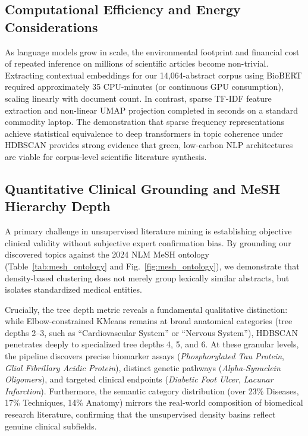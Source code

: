 \documentclass[a4paper,fleqn]{cas-dc}
\begin{document}
\subsection{Computational Efficiency and Energy Considerations}

As language models grow in scale, the environmental footprint and financial cost of repeated inference on millions of scientific articles become non-trivial. Extracting contextual embeddings for our 14,064-abstract corpus using BioBERT required approximately 35 CPU-minutes (or continuous GPU consumption), scaling linearly with document count. In contrast, sparse TF-IDF feature extraction and non-linear UMAP projection completed in seconds on a standard commodity laptop. The demonstration that sparse frequency representations achieve statistical equivalence to deep transformers in topic coherence under HDBSCAN provides strong evidence that green, low-carbon NLP architectures are viable for corpus-level scientific literature synthesis.

\subsection{Quantitative Clinical Grounding and MeSH Hierarchy Depth}

A primary challenge in unsupervised literature mining is establishing objective clinical validity without subjective expert confirmation bias. By grounding our discovered topics against the 2024 NLM MeSH ontology (Table~\ref{tab:mesh_ontology} and Fig.~\ref{fig:mesh_ontology}), we demonstrate that density-based clustering does not merely group lexically similar abstracts, but isolates standardized medical entities. 

Crucially, the tree depth metric reveals a fundamental qualitative distinction: while Elbow-constrained KMeans remains at broad anatomical categories (tree depths 2--3, such as ``Cardiovascular System'' or ``Nervous System''), HDBSCAN penetrates deeply to specialized tree depths 4, 5, and 6. At these granular levels, the pipeline discovers precise biomarker assays (\textit{Phosphorylated Tau Protein}, \textit{Glial Fibrillary Acidic Protein}), distinct genetic pathways (\textit{Alpha-Synuclein Oligomers}), and targeted clinical endpoints (\textit{Diabetic Foot Ulcer}, \textit{Lacunar Infarction}). Furthermore, the semantic category distribution (over 23\% Diseases, 17\% Techniques, 14\% Anatomy) mirrors the real-world composition of biomedical research literature, confirming that the unsupervised density basins reflect genuine clinical subfields.
\end{document}
